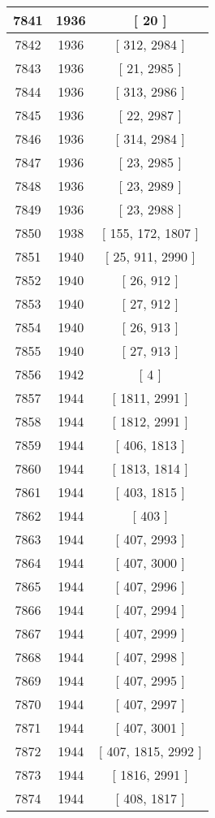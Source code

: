 \begin{center}
\begin{longtable}[H]{|| c c c ||}
\hline
7841 & 1936 & [ 20 ] \\ 
\hline
7842 & 1936 & [ 312, 2984 ] \\ 
\hline
7843 & 1936 & [ 21, 2985 ] \\ 
\hline
7844 & 1936 & [ 313, 2986 ] \\ 
\hline
7845 & 1936 & [ 22, 2987 ] \\ 
\hline
7846 & 1936 & [ 314, 2984 ] \\ 
\hline
7847 & 1936 & [ 23, 2985 ] \\ 
\hline
7848 & 1936 & [ 23, 2989 ] \\ 
\hline
7849 & 1936 & [ 23, 2988 ] \\ 
\hline
7850 & 1938 & [ 155, 172, 1807 ] \\ 
\hline
7851 & 1940 & [ 25, 911, 2990 ] \\ 
\hline
7852 & 1940 & [ 26, 912 ] \\ 
\hline
7853 & 1940 & [ 27, 912 ] \\ 
\hline
7854 & 1940 & [ 26, 913 ] \\ 
\hline
7855 & 1940 & [ 27, 913 ] \\ 
\hline
7856 & 1942 & [ 4 ] \\ 
\hline
7857 & 1944 & [ 1811, 2991 ] \\ 
\hline
7858 & 1944 & [ 1812, 2991 ] \\ 
\hline
7859 & 1944 & [ 406, 1813 ] \\ 
\hline
7860 & 1944 & [ 1813, 1814 ] \\ 
\hline
7861 & 1944 & [ 403, 1815 ] \\ 
\hline
7862 & 1944 & [ 403 ] \\ 
\hline
7863 & 1944 & [ 407, 2993 ] \\ 
\hline
7864 & 1944 & [ 407, 3000 ] \\ 
\hline
7865 & 1944 & [ 407, 2996 ] \\ 
\hline
7866 & 1944 & [ 407, 2994 ] \\ 
\hline
7867 & 1944 & [ 407, 2999 ] \\ 
\hline
7868 & 1944 & [ 407, 2998 ] \\ 
\hline
7869 & 1944 & [ 407, 2995 ] \\ 
\hline
7870 & 1944 & [ 407, 2997 ] \\ 
\hline
7871 & 1944 & [ 407, 3001 ] \\ 
\hline
7872 & 1944 & [ 407, 1815, 2992 ] \\ 
\hline
7873 & 1944 & [ 1816, 2991 ] \\ 
\hline
7874 & 1944 & [ 408, 1817 ] \\ 

\end{longtable}
\end{center}
